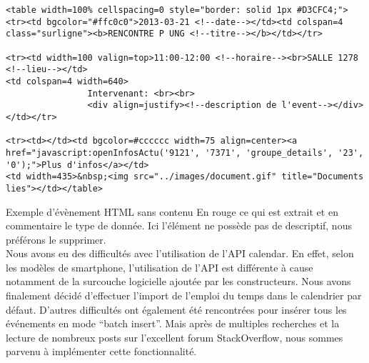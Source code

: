 \begin{adjustbox}{minipage=1.14\textwidth,margin=0pt \smallskipamount,center}
\begin{lstlisting}[style=XML, label=htmlCode]
<table width=100% cellspacing=0 style="border: solid 1px #D3CFC4;"><tr><td bgcolor="#ffc0c0">2013-03-21 <!--date--></td><td colspan=4 class="surligne"><b>RENCONTRE P UNG <!--titre--></b></td></tr>

<tr><td width=100 valign=top>11:00-12:00 <!--horaire--><br>SALLE 1278 <!--lieu--></td>
<td colspan=4 width=640>
	            Intervenant: <br><br>
				<div align=justify><!--description de l'event--></div></td></tr>

<tr><td></td><td bgcolor=#cccccc width=75 align=center><a href="javascript:openInfosActu('9121', '7371', 'groupe_details', '23', '0');">Plus d'infos</a></td>
<td width=435>&nbsp;<img src="../images/document.gif" title="Documents lies"></td></table>
\end{lstlisting}
\end{adjustbox}

Exemple d'évènement HTML sans contenu
En rouge ce qui est extrait et en commentaire le type de donnée. Ici l’élément ne possède pas de descriptif, nous préférons le supprimer. \\

Nous avons eu des difficultés avec l’utilisation de l’API calendar. En effet, selon les modèles de smartphone, l’utilisation de l’API est différente à cause notamment de la surcouche logicielle ajoutée par les constructeurs. Nous avons finalement décidé d’effectuer l’import de l’emploi du temps dans le calendrier par défaut. D’autres difficultés ont également été rencontrées pour insérer tous les événements en mode “batch insert”. Mais après de multiples recherches et la lecture de nombreux posts sur l’excellent forum StackOverflow, nous sommes parvenu à implémenter cette fonctionnalité.

